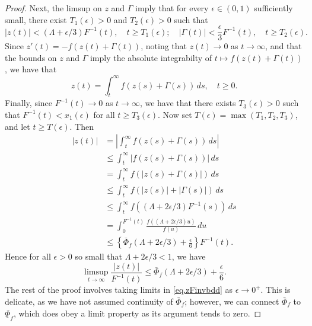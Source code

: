\documentclass[a4paper,10pt,reqno]{amsart}
\numberwithin{equation}{section}
\theoremstyle{definition}
\theoremstyle{remark}
\DeclareMathOperator{\1}{\mathbbm 1}
\begin{document}
\begin{proof}
		Next, the limsup on $z$ and $\Gamma$ imply that for every $\epsilon\in (0,1)$ sufficiently small, there exist $T_1(\epsilon)>0$ and $T_2(\epsilon)>0$ such that 
		\[
		|z(t)|<(\Lambda+\epsilon/3)F^{-1}(t), \quad t\geq T_1(\epsilon); \quad
		|\Gamma(t)|< \frac{\epsilon}{3} F^{-1}(t), \quad t\geq T_2(\epsilon).
		\]
		Since $z'(t)=-f(z(t)+\Gamma(t))$, noting that $z(t)\to 0$ as $t\to\infty$, and that the bounds on $z$ and $\Gamma$ imply the absolute integrabilty of $t\mapsto f(z(t)+\Gamma(t))$, we have that 
		\[
		z(t)=\int_t^\infty f(z(s)+\Gamma(s))\,ds, \quad t\geq 0.
		\] 
		Finally, since $F^{-1}(t)\to 0$ as $t\to\infty$, we have that there exists $T_3(\epsilon)>0$ such that $F^{-1}(t)<x_1(\epsilon)$ for all $t\geq T_3(\epsilon)$. Now set $T(\epsilon)=\max(T_1,T_2,T_3)$, and let $t\geq T(\epsilon)$. Then 
		\begin{align*}
			|z(t)|&=\left|\int_t^\infty f(z(s)+\Gamma(s))\,ds\right|\\
			&\leq \int_t^\infty |f(z(s)+\Gamma(s))|\,ds\\
			&= \int_t^\infty f(|z(s)+\Gamma(s)|)\,ds\\
			&\leq \int_t^\infty f(|z(s)|+|\Gamma(s)|)\,ds\\
			&\leq \int_t^\infty f((\Lambda+2\epsilon/3)F^{-1}(s))\,ds\\
			&=\int_0^{F^{-1}(t)} \frac{f((\Lambda+2\epsilon/3)u)}{f(u)}\,du\\
			&\leq \left\{\bar{\Phi}_f(\Lambda+2\epsilon/3)+\frac{\epsilon}{6}\right\}F^{-1}(t).
		\end{align*}
		Hence for all $\epsilon>0$ so small that $\Lambda+2\epsilon/3<1$, we have 
		\begin{equation} \label{eq.zFinvbdd}
			\limsup_{t\to\infty} \frac{|z(t)|}{F^{-1}(t)}\leq \bar{\Phi}_f(\Lambda+2\epsilon/3)+\frac{\epsilon}{6}.
		\end{equation}
		The rest of the proof involves taking limits in \eqref{eq.zFinvbdd}
		as $\epsilon\to 0^+$. This is delicate, as we have not assumed continuity of $\bar{\Phi}_f$; however, we can connect $\bar{\Phi}_f$ to $\underline{\Phi}_f$, which does obey a limit property as its argument tends to zero. 
		

\end{proof}
\end{document}
